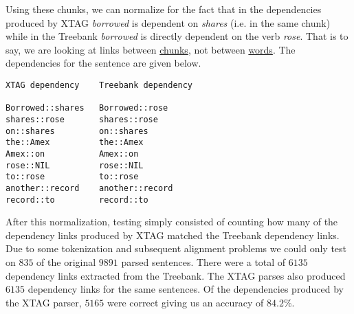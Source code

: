Using these chunks, we can normalize for the fact that in the 
dependencies produced by XTAG {\em borrowed} is dependent on {\em shares} (i.e. in the same chunk) while in the Treebank {\em borrowed} 
is directly dependent on the verb {\em rose}. That is to say, we are 
looking at links between \underline{chunks}, not between 
\underline{words}. The dependencies for the sentence are given below. 
 
\begin{verbatim} 
XTAG dependency    Treebank dependency 
 
Borrowed::shares   Borrowed::rose 
shares::rose       shares::rose 
on::shares         on::shares 
the::Amex          the::Amex 
Amex::on           Amex::on 
rose::NIL          rose::NIL 
to::rose           to::rose 
another::record    another::record 
record::to         record::to 
\end{verbatim} 
 
After this normalization, testing simply consisted of counting how 
many of the dependency links produced by XTAG matched the Treebank 
dependency links. Due to some tokenization and subsequent alignment 
problems we could only test on $835$ of the original $9891$ parsed 
sentences. There were a total of $6135$ dependency links extracted 
from the Treebank. The XTAG parses also produced $6135$ dependency 
links for the same sentences. Of the dependencies produced by the XTAG 
parser, $5165$ were correct giving us an accuracy of $84.2\%$. 
 
 
 
 
